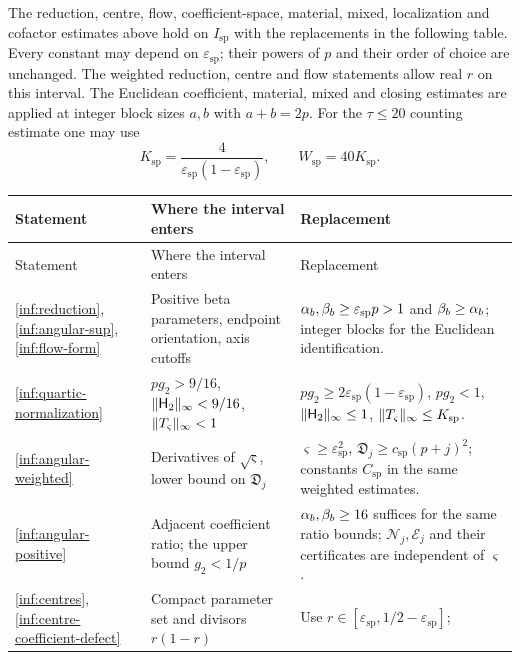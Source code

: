 \begin{lemma}\label{inf:split-extension}
The reduction, centre, flow, coefficient-space, material, mixed,
localization and cofactor estimates above hold on $I_{\mathrm{sp}}$
with the replacements in the following table. Every constant may
depend on $\varepsilon_{\mathrm{sp}}$; their powers of $p$ and their
order of choice are unchanged. The weighted reduction, centre and
flow statements allow real $r$ on this interval. The Euclidean
coefficient, material, mixed and closing estimates are applied at
integer block sizes $a,b$ with $a+b=2p$.
For the $\tau\le20$ counting estimate
one may use
\[
 K_{\mathrm{sp}}=\frac4{\varepsilon_{\mathrm{sp}}
                            (1-\varepsilon_{\mathrm{sp}})},\qquad
 W_{\mathrm{sp}}=40K_{\mathrm{sp}}.
\]
\begingroup\small\normalfont
\renewcommand{\arraystretch}{1.13}
\begin{longtable}{@{}>{\raggedright\arraybackslash}p{}>{\raggedright\arraybackslash}p{}>{\raggedright\arraybackslash}p{}@{}}
\toprule Statement & Where the interval enters & Replacement\\\midrule
\endfirsthead
\toprule Statement & Where the interval enters & Replacement\\\midrule
\endhead
\ref{inf:reduction}, \ref{inf:angular-sup}, \ref{inf:flow-form} &
Positive beta parameters, endpoint orientation, axis cutoffs &
$\alpha_b,\beta_b\ge\varepsilon_{\mathrm{sp}}p>1$ and $\beta_b\ge\alpha_b$;
integer blocks for the Euclidean identification.\\
\ref{inf:quartic-normalization} & $pg_2>9/16$,
$\lVert \mathsf H_2\rVert_\infty<9/16$, $\lVert T_\varsigma\rVert_\infty<1$ &
$pg_2\ge2\varepsilon_{\mathrm{sp}}(1-\varepsilon_{\mathrm{sp}})$,
$pg_2<1$, $\lVert \mathsf H_2\rVert_\infty\le1$,
$\lVert T_\varsigma\rVert_\infty\le K_{\mathrm{sp}}$.\\
\ref{inf:angular-weighted} & Derivatives of $\sqrt\varsigma$,
lower bound on $\mathfrak D_j$ &
$\varsigma\ge\varepsilon_{\mathrm{sp}}^2$,
$\mathfrak D_j\ge c_{\mathrm{sp}}(p+j)^2$;
constants $C_{\mathrm{sp}}$ in the same weighted estimates.\\
\ref{inf:angular-positive} & Adjacent coefficient ratio;
the upper bound $g_2<1/p$ &
$\alpha_b,\beta_b\ge16$ suffices for the same ratio bounds;
$\mathcal N_j,\mathcal E_j$ and their certificates are
independent of $\varsigma$.\\
\ref{inf:centres}, \ref{inf:centre-coefficient-defect} &
Compact parameter set and divisors $r(1-r)$ &
Use $r\in[\varepsilon_{\mathrm{sp}},1/2-\varepsilon_{\mathrm{sp}}]$;

\end{longtable}
\end{lemma}
